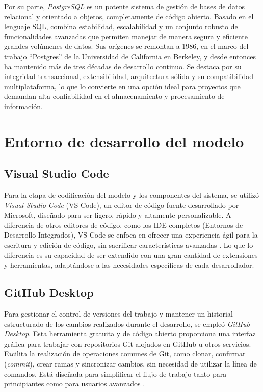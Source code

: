 Por su parte, \textit{PostgreSQL} es un potente sistema de gestión de bases de datos relacional y orientado a objetos, completamente de código abierto. Basado en el lenguaje SQL, combina estabilidad, escalabilidad y un conjunto robusto de funcionalidades avanzadas que permiten manejar de manera segura y eficiente grandes volúmenes de datos.  
Sus orígenes se remontan a 1986, en el marco del trabajo “Postgres” de la Universidad de California en Berkeley, y desde entonces ha mantenido más de tres décadas de desarrollo continuo.  
Se destaca por su integridad transaccional, extensibilidad, arquitectura sólida y su compatibilidad multiplataforma, lo que lo convierte en una opción ideal para proyectos que demandan alta confiabilidad en el almacenamiento y procesamiento de información\cite{postgresql}.




\section{Entorno de desarrollo del modelo}

\subsection{Visual Studio Code}
Para la etapa de codificación del modelo y los componentes del sistema, se utilizó \textit{Visual Studio Code} (VS Code), un editor de código fuente desarrollado por Microsoft, diseñado para ser ligero, rápido y altamente personalizable. A diferencia de otros editores de código, como los IDE completos (Entornos de Desarrollo Integrados), VS Code se enfoca en ofrecer una experiencia ágil para la escritura y edición de código, sin sacrificar características avanzadas \cite{vscode}. Lo que lo diferencia es su capacidad de ser extendido con una gran cantidad de extensiones y herramientas, adaptándose a las necesidades específicas de cada desarrollador.

\subsection{GitHub Desktop}
Para gestionar el control de versiones del trabajo y mantener un historial estructurado de los cambios realizados durante el desarrollo, se empleó \textit{GitHub Desktop}. Esta herramienta gratuita y de código abierto proporciona una interfaz gráfica para trabajar con repositorios Git alojados en GitHub u otros servicios. Facilita la realización de operaciones comunes de Git, como clonar, confirmar (\textit{commit}), crear ramas y sincronizar cambios, sin necesidad de utilizar la línea de comandos. Está diseñada para simplificar el flujo de trabajo tanto para principiantes como para usuarios avanzados \cite{githubdesktop}.


